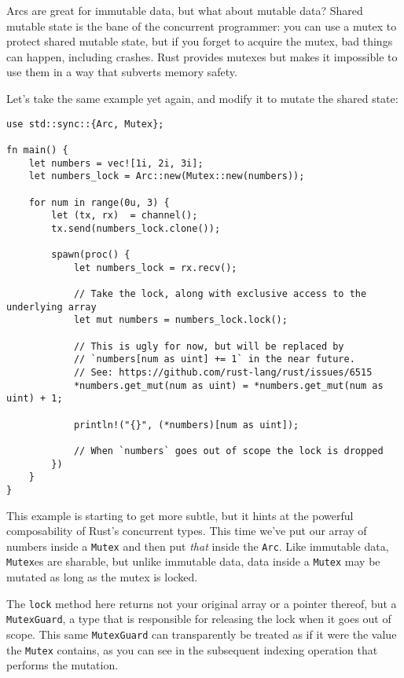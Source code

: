 \documentclass[]{article}
\begin{document}
Arcs are great for immutable data, but what about mutable data? Shared
mutable state is the bane of the concurrent programmer: you can use a
mutex to protect shared mutable state, but if you forget to acquire the
mutex, bad things can happen, including crashes. Rust provides mutexes
but makes it impossible to use them in a way that subverts memory
safety.

Let's take the same example yet again, and modify it to mutate the
shared state:

\begin{verbatim}
use std::sync::{Arc, Mutex};

fn main() {
    let numbers = vec![1i, 2i, 3i];
    let numbers_lock = Arc::new(Mutex::new(numbers));

    for num in range(0u, 3) {
        let (tx, rx)  = channel();
        tx.send(numbers_lock.clone());

        spawn(proc() {
            let numbers_lock = rx.recv();

            // Take the lock, along with exclusive access to the underlying array
            let mut numbers = numbers_lock.lock();

            // This is ugly for now, but will be replaced by
            // `numbers[num as uint] += 1` in the near future.
            // See: https://github.com/rust-lang/rust/issues/6515
            *numbers.get_mut(num as uint) = *numbers.get_mut(num as uint) + 1;

            println!("{}", (*numbers)[num as uint]);

            // When `numbers` goes out of scope the lock is dropped
        })
    }
}
\end{verbatim}

This example is starting to get more subtle, but it hints at the
powerful composability of Rust's concurrent types. This time we've put
our array of numbers inside a \texttt{Mutex} and then put \emph{that}
inside the \texttt{Arc}. Like immutable data, \texttt{Mutex}es are
sharable, but unlike immutable data, data inside a \texttt{Mutex} may be
mutated as long as the mutex is locked.

The \texttt{lock} method here returns not your original array or a
pointer thereof, but a \texttt{MutexGuard}, a type that is responsible
for releasing the lock when it goes out of scope. This same
\texttt{MutexGuard} can transparently be treated as if it were the value
the \texttt{Mutex} contains, as you can see in the subsequent indexing
operation that performs the mutation.
\end{document}
